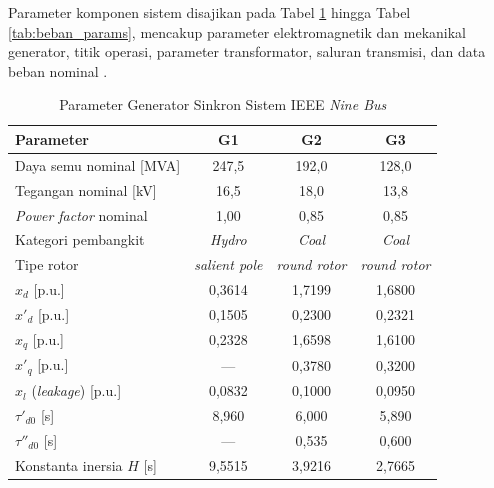 Parameter komponen sistem disajikan pada Tabel \ref{tab:generator_params} hingga
Tabel \ref{tab:beban_params}, mencakup parameter elektromagnetik dan mekanikal
generator, titik operasi, parameter transformator, saluran transmisi, dan data
beban nominal \cite{anderson1977power}.

\begin{table}[H]
  \caption{Parameter Generator Sinkron Sistem IEEE \textit{Nine Bus}}
  \vspace{0.5em}
  \centering
  \fontsize{12}{14.4}\selectfont
  \setlength{\tabcolsep}{6pt}
  \begin{tabular}{>{\raggedright\arraybackslash}m{5cm} c c c}
    \toprule
    \textbf{Parameter} & \textbf{G1} & \textbf{G2} & \textbf{G3} \\
    \midrule
    Daya semu nominal [MVA]      & 247,5        & 192,0        & 128,0        \\
    Tegangan nominal [kV]        & 16,5         & 18,0         & 13,8         \\
    \textit{Power factor} nominal & 1,00        & 0,85         & 0,85         \\
    Kategori pembangkit          & \textit{Hydro} & \textit{Coal} &
    \textit{Coal} \\
    Tipe rotor                   & \textit{salient pole} & \textit{round rotor}
    & \textit{round rotor} \\
    $x_d$ [p.u.]                 & 0,3614       & 1,7199       & 1,6800       \\
    $x'_d$ [p.u.]                & 0,1505       & 0,2300       & 0,2321       \\
    $x_q$ [p.u.]                 & 0,2328       & 1,6598       & 1,6100       \\
    $x'_q$ [p.u.]                & ---          & 0,3780       & 0,3200       \\
    $x_l$ (\textit{leakage}) [p.u.] & 0,0832    & 0,1000       & 0,0950       \\
    $\tau'_{d0}$ [s]             & 8,960        & 6,000        & 5,890        \\
    $\tau''_{d0}$ [s]            & ---          & 0,535        & 0,600        \\
    Konstanta inersia $H$ [s]    & 9,5515       & 3,9216       & 2,7665       \\
    \bottomrule
  \end{tabular}
  \label{tab:generator_params}
\end{table}

